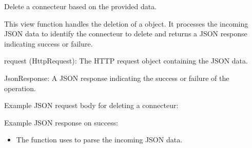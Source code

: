 \documentclass[letterpaper,10pt,english]{sphinxmanual}
\begin{document}

\begin{fulllineitems}
\label{\detokenize{app:app.views.delete_connecteur}}
\pysigstartsignatures
{}
\pysigstopsignatures
\sphinxAtStartPar
Delete a connecteur based on the provided data.

\sphinxAtStartPar
This view function handles the deletion of a  object. 
It processes the incoming JSON data to identify the connecteur to delete and 
returns a JSON response indicating success or failure.
\begin{description}
\sphinxAtStartPar
request (HttpRequest): The HTTP request object containing the JSON data.

\sphinxAtStartPar
JsonResponse: A JSON response indicating the success or failure of the operation.

\sphinxAtStartPar
Example JSON request body for deleting a connecteur:

\begin{sphinxVerbatim}[commandchars=\\\{\}]
\end{sphinxVerbatim}

\sphinxAtStartPar
Example JSON response on success:

\begin{sphinxVerbatim}[commandchars=\\\{\}]
\end{sphinxVerbatim}

\begin{itemize}
\item {} 
\sphinxAtStartPar
The function uses  to parse the incoming JSON data.


\end{itemize}
\end{description}
\end{fulllineitems}
\end{document}
